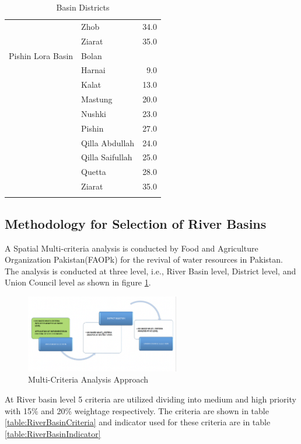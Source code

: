 \begin{longtable}[H]{| l | l | r |}
    & Zhob            & 34.0              \\
    & Ziarat          & 35.0              \\
    \hline
    Pishin Lora Basin      & Bolan           &                   \\
    & Harnai          & 9.0               \\
    & Kalat           & 13.0              \\
    & Mastung         & 20.0              \\
    & Nushki          & 23.0              \\
    & Pishin          & 27.0              \\
    & Qilla Abdullah  & 24.0              \\
    & Qilla Saifullah & 25.0              \\
    & Quetta          & 28.0              \\
    & Ziarat          & 35.0              \\
    \hline
    \caption{Basin Districts}
    \label{table:basin-dist}
\end{longtable}

\subsection{Methodology for Selection of River Basins}
A Spatial Multi-criteria analysis is conducted by Food and Agriculture Organization Pakistan(FAOPk) for the revival of water resources in Pakistan. The analysis is conducted at three level, i.e., River Basin level, District level, and Union Council level as shown in figure \ref{fig:MCARiver}.

\begin{figure}[H]
    \centering
    \includegraphics[width=0.6\textwidth]{images/MCARiver.png}
    \caption{Multi-Criteria Analysis Approach}\label{fig:MCARiver}
\end{figure}

At River basin level 5 criteria are utilized dividing into medium and high priority with 15\% and 20\% weightage respectively. The criteria are shown in table \ref{table:RiverBasinCriteria} and indicator used for these criteria are in table \ref{table:RiverBasinIndicator}

